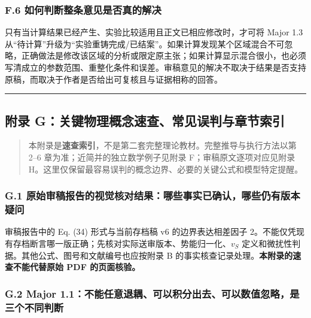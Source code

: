 \documentclass[
  chinese,
  UTF8]{ctexart}
\begin{document}
\subsubsection{F.6
如何判断整条意见是否真的解决}\label{f.6-ux5982ux4f55ux5224ux65adux6574ux6761ux610fux89c1ux662fux5426ux771fux7684ux89e3ux51b3}

只有当计算结果已经产生、实验比较适用且正文已相应修改时，才可将 Major 1.3
从``待计算''升级为``实验重铸完成/已结案''。如果计算发现某个区域混合不可忽略，正确做法是修改该区域的分析或限定原主张；如果计算显示混合很小，也必须写清成立的参数范围、重整化条件和误差。审稿意见的解决不取决于结果是否支持原稿，而取决于作者是否给出可复核且与证据相称的回答。

\begin{center}\rule{0.5\linewidth}{0.5pt}\end{center}

\subsection{附录
G：关键物理概念速查、常见误判与章节索引}\label{ux9644ux5f55-gux5173ux952eux7269ux7406ux6982ux5ff5ux901fux67e5ux5e38ux89c1ux8befux5224ux4e0eux7ae0ux8282ux7d22ux5f15}

\begin{quote}
本附录是\textbf{速查索引}，不是第二套完整理论教材。完整推导与执行方法以第
2--6 章为准；近简并的独立数学例子见附录 F；审稿原文逐项对应见附录
H。这里仅保留最容易误判的概念边界、必要的关键公式和模型特定提醒。
\end{quote}

\subsubsection{G.1
原始审稿报告的视觉核对结果：哪些事实已确认，哪些仍有版本疑问}\label{g.1-ux539fux59cbux5ba1ux7a3fux62a5ux544aux7684ux89c6ux89c9ux6838ux5bf9ux7ed3ux679cux54eaux4e9bux4e8bux5b9eux5df2ux786eux8ba4ux54eaux4e9bux4ecdux6709ux7248ux672cux7591ux95ee}

审稿报告中的 Eq. (34) 形式与当前存档稿 v6 的边界表达相差因子
2。不能仅凭现有存档断言哪一版正确；先核对实际送审版本、势能归一化、\(v_S\)
定义和微扰性判据。其他公式、图号和文献编号也应按附录 B
的事实核查记录处理。\textbf{本附录的速查不能代替原始 PDF 的页面核验。}

\subsubsection{G.2 Major
1.1：不能任意退耦、可以积分出去、可以数值忽略，是三个不同判断}\label{g.2-major-1.1ux4e0dux80fdux4efbux610fux9000ux8026ux53efux4ee5ux79efux5206ux51faux53bbux53efux4ee5ux6570ux503cux5ffdux7565ux662fux4e09ux4e2aux4e0dux540cux5224ux65ad}
\end{document}

